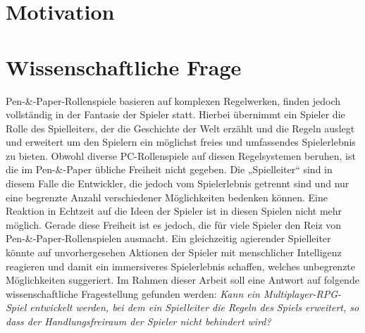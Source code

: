 

\section{Motivation}
\label{sec:Motivation}

\section{Wissenschaftliche Frage}
\label{sec:WissenschaftlicheFrage}

Pen-\&-Paper-Rollenspiele basieren auf komplexen Regelwerken, finden jedoch vollständig in der Fantasie der Spieler statt. Hierbei übernimmt ein Spieler die Rolle des Spielleiters, der die Geschichte der Welt erzählt und die Regeln auslegt und erweitert um den Spielern ein möglichst freies und umfassendes Spielerlebnis zu bieten. Obwohl diverse PC-Rollenspiele auf diesen Regelsystemen beruhen, ist die im Pen-\&-Paper übliche Freiheit nicht gegeben. Die „Spielleiter“ sind in diesem Falle die Entwickler, die jedoch vom Spielerlebnis getrennt sind und nur eine begrenzte Anzahl verschiedener Möglichkeiten bedenken können. Eine Reaktion in Echtzeit auf die Ideen der Spieler ist in diesen Spielen nicht mehr möglich.\newline
Gerade diese Freiheit ist es jedoch, die für viele Spieler den Reiz von Pen-\&-Paper-Rollenspielen ausmacht. Ein gleichzeitig agierender Spielleiter könnte auf unvorhergesehen Aktionen der Spieler mit menschlicher Intelligenz reagieren und damit ein immersiveres Spielerlebnis schaffen, welches unbegrenzte Möglichkeiten suggeriert. 
Im Rahmen dieser Arbeit soll eine Antwort auf folgende wissenschaftliche Fragestellung gefunden werden:\newline
\emph{Kann ein Multiplayer-RPG-Spiel entwickelt werden, bei dem ein Spielleiter die Regeln des Spiels erweitert, so dass der Handlungsfreiraum der Spieler nicht behindert wird?}

